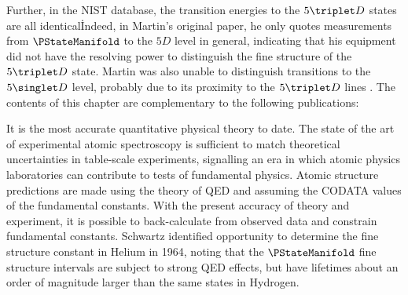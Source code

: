 

	Further, in the NIST database, the transition energies to the $5\triplet D$ states are all identical\.
	Indeed, in Martin's original paper, he only quotes measurements from $\PStateManifold$ to the $5D$ level in general, indicating that his equipment did not have the resolving power to distinguish the fine structure of the $5\triplet D$ state.
	Martin was also unable to distinguish transitions to the $5\singlet D$ level, probably due to its proximity to the $5\triplet D$ lines .
	The contents of this chapter are complementary to the following publications:


	It is the most accurate quantitative physical theory to date.
	The state of the art of experimental atomic spectroscopy is sufficient to match theoretical uncertainties in table-scale experiments, signalling an era in which atomic physics laboratories can contribute to tests of fundamental physics.
	Atomic structure predictions are made using the theory of QED and assuming the CODATA values of the fundamental constants.
	With the present accuracy of theory and experiment, it is possible to back-calculate from observed data and constrain fundamental constants.
	Schwartz identified opportunity to determine the fine structure constant in Helium in 1964, noting that the $\PStateManifold$ fine structure intervals are subject to strong QED effects, but have lifetimes about an order of magnitude larger than the same states in Hydrogen.
	

	

